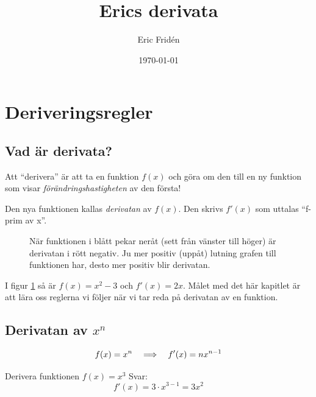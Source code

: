 \documentclass[a4paper, 12pt]{article}
\title{Erics derivata}
\author{Eric Fridén}
\date{\today}
\begin{document}
\doublespacing
\maketitle

\intro

\section{Deriveringsregler}

\subsection{Vad är derivata?}

Att ``derivera'' är att ta en funktion $f(x)$ och göra om den till en ny funktion som visar \emph{förändringshastigheten} av den första!

Den nya funktionen kallas \emph{derivatan} av $f(x)$. Den skrivs $f'(x)$ som uttalas ``f-prim av x''.

\begin{figure}[h]
    \centering
    \caption{När funktionen i blått pekar neråt (sett från vänster till höger) är derivatan i rött negativ. Ju mer positiv (uppåt) lutning grafen till funktionen har, desto mer positiv blir derivatan.}
    \label{fig:1}
\end{figure}

I figur \ref{fig:1} så är $f(x) = x^2 - 3$ och $f'(x) = 2x$. Målet med det här kapitlet är att lära oss reglerna vi följer när vi tar reda på derivatan av en funktion.


\subsection{Derivatan av $x^n$}

\begin{regel}
    \label{reg:x^n}
    \[f(x) = x^n \hspace{1em} \Longrightarrow \hspace{1em} f'(x) = nx^{n-1}\]
\end{regel}

\begin{exempel}
    Derivera funktionen $f(x) = x^3$
    \dinkus
    Svar: \[f'(x) = 3\cdot x^{3-1} = 3x^2\]
\end{exempel}
\end{document}
